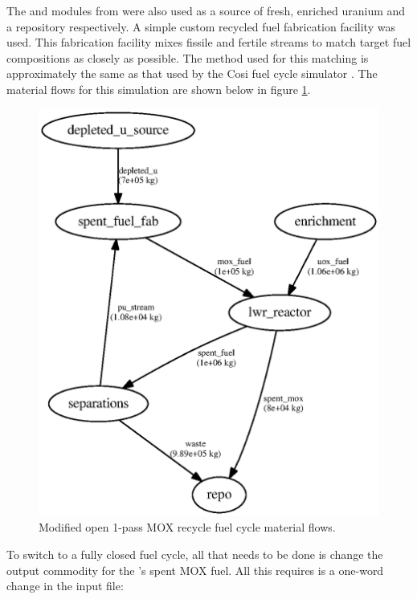 The  and  modules from \Cycamore were also used as a
source of fresh, enriched uranium and a repository respectively. A simple
custom recycled fuel fabrication facility was used.  This fabrication facility
mixes fissile and fertile streams to match target fuel compositions as closely
as possible.  The method used for this matching is approximately the same as
that used by the Cosi fuel cycle simulator . The material flows for this simulation are shown below in figure
\ref{fig:flow-modopen}.

\begin{figure}[!]
\label{fig:flow-modopen}
\caption{Modified open 1-pass MOX recycle fuel cycle material flows.}
\begin{center}
\includegraphics{./images/flow-mod-open-1.eps}
\end{center}
\end{figure}

To switch to a fully closed fuel cycle, all that needs to be done is change
the output commodity for the 's spent MOX fuel.  All this
requires is a one-word change in the input file: 


